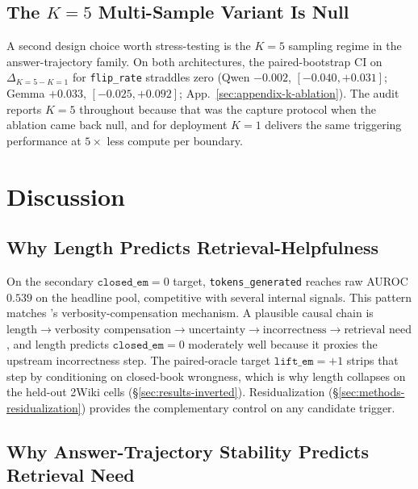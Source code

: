 \documentclass[11pt]{article}
\begin{document}
\subsection{The $K{=}5$ Multi-Sample Variant Is Null}
\label{sec:results-ablation}

A second design choice worth stress-testing is the $K{=}5$ sampling regime in the answer-trajectory family. On both architectures, the paired-bootstrap CI on $\Delta_{K{=}5 - K{=}1}$ for \texttt{flip\_rate} straddles zero (Qwen $-0.002$, $[-0.040, +0.031]$; Gemma $+0.033$, $[-0.025, +0.092]$; App.~\ref{sec:appendix-k-ablation}). The audit reports $K{=}5$ throughout because that was the capture protocol when the ablation came back null, and for deployment $K{=}1$ delivers the same triggering performance at $5\times$ less compute per boundary.\textbf{}

\section{Discussion}
\label{sec:discussion}

\subsection{Why Length Predicts Retrieval-Helpfulness}
\label{sec:discussion-causal}

On the secondary $\texttt{closed\_em}{=}0$ target, \texttt{tokens\_generated} reaches raw AUROC $0.539$ on the headline pool, competitive with several internal signals. This pattern matches \citet{zhang_verbosity_2024}'s verbosity-compensation mechanism. A plausible causal chain is $\text{length} \rightarrow \text{verbosity compensation} \rightarrow \text{uncertainty} \rightarrow \text{incorrectness} \rightarrow \text{retrieval need}$, and length predicts $\texttt{closed\_em}{=}0$ moderately well because it proxies the upstream incorrectness step. The paired-oracle target $\texttt{lift\_em}{=}+1$ strips that step by conditioning on closed-book wrongness, which is why length collapses on the held-out 2Wiki cells (\S\ref{sec:results-inverted}). Residualization (\S\ref{sec:methods-residualization}) provides the complementary control on any candidate trigger.

\subsection{Why Answer-Trajectory Stability Predicts Retrieval Need}
\label{sec:discussion-fct}
\end{document}
